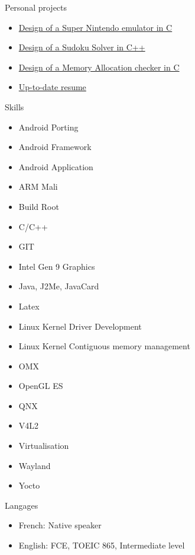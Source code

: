 \documentclass[a4paper, 10pt]{article}
\begin{document}
\begin{unbreakableSection} {Personal projects}
    \begin{projects}
	\begin{itemize}[parsep=0cm,itemsep=0cm,topsep=0cm]
	    \item \href{https://github.com/grassead/snesemu}{Design of a Super Nintendo emulator in C}
	    \item \href{https://github.com/grassead/sudokusolver}{Design of a Sudoku Solver in C++}
	    \item \href{https://github.com/grassead/memorychecker}{Design of a Memory Allocation checker in C}
	    \item \href{https://github.com/grassead/cv}{Up-to-date resume}
	\end{itemize}
    \end{projects}
\end{unbreakableSection}

\begin{section} {Skills}
    \begin{skills}
	\begin{itemize}[parsep=0cm,itemsep=0cm,topsep=0cm]
	    \item Android Porting
	    \item Android Framework
	    \item Android Application
	    \item ARM Mali
	    \item Build Root
	    \item C/C++
	    \item GIT
	    \item Intel Gen 9 Graphics
	    \item Java, J2Me, JavaCard
	    \item Latex
	    \item Linux Kernel Driver Development
	    \item Linux Kernel Contiguous memory management
	    \item OMX
	    \item OpenGL ES
	    \item QNX
	    \item V4L2
	    \item Virtualisation
	    \item Wayland
	    \item Yocto
	\end{itemize}
    \end{skills}
\end{section}

\begin{section} {Langages}
    \begin{languages}
	\begin{itemize}[parsep=0cm,itemsep=0cm,topsep=0cm]
	    \item French: Native speaker
	    \item English: FCE, TOEIC 865, Intermediate level
	\end{itemize}
    \end{languages}
\end{section}
\end{document}
